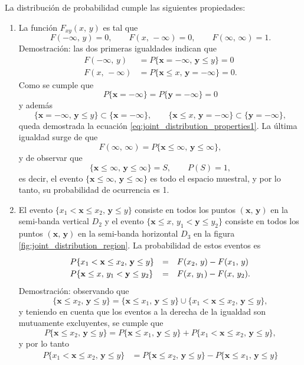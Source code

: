 \documentclass[a4paper]{report}
\newcommand{\x}{\mathbf{x}}
\newcommand{\y}{\mathbf{y}}
\begin{document}
La distribución de probabilidad cumple las siguientes propiedades:
\begin{enumerate}[1.]
 \item La función \(F_{xy}(x,\,y)\) es tal que
 \[
  F(-\infty,\,y)=0,\qquad F(x,\,-\infty)=0,\qquad F(\infty,\,\infty)=1.
 \]
 Demostración: las dos primeras igualdades indican que
 \begin{equation}\label{eq:joint_distribution_properties1}
 \begin{aligned}
    F(-\infty,\,y)&=P\{\x=-\infty,\,\y\leq y\}=0\\
    F(x,\,-\infty)&=P\{\x\leq x,\,\y=-\infty\}=0.
 \end{aligned}
 \end{equation}
 Como se cumple que
 \[
  P\{\x=-\infty\}=P\{\y=-\infty\}=0
 \]
 y además
 \[
  \{\x=-\infty,\,\y\leq y\}\subset \{\x=-\infty\},\qquad \{\x\leq x,\,\y=-\infty\}\subset \{\y=-\infty\},
 \]
 queda demostrada la ecuación \ref{eq:joint_distribution_properties1}. La última igualdad surge de que
 \[
  F(\infty,\,\infty)=P\{\x\leq\infty,\,\y\leq \infty\},
 \]
 y de observar que 
 \[
  \{\x\leq\infty,\,\y\leq \infty\}=S, \qquad P(S)=1,
 \]
 es decir, el evento \(\{\x\leq\infty,\,\y\leq \infty\}\) es todo el espacio muestral, y por lo tanto, su probabilidad de ocurrencia es 1.
 \item El evento \(\{x_1<\x\leq x_2,\,\y\leq y\}\) consiste en todos los puntos \((\x,\,\y)\) en la semi-banda vertical \(D_2\) y el evento \(\{\x\leq x,\,y_1<\y\leq y_2\}\) consiste en todos los puntos \((\x,\,\y)\) en la semi-banda horizontal \(D_3\) en la figura \ref{fig:joint_distribution_region}. La probabilidad de estos eventos es
 \begin{equation}\label{eq:joint_distribution_properties2}
 \def\arraystretch{1.2}
 \begin{array}{lll}
    P\{x_1<\x\leq x_2,\,\y\leq y\}&=&F(x_2,\,y)-F(x_1,\,y)\\
    P\{\x\leq x,\,y_1<\y\leq y_2\}&=&F(x,\,y_1)-F(x,\,y_2).
 \end{array}
 \end{equation} 
Demostración: observando que
\[
 \{\x\leq x_2,\,\y\leq y\}=\{\x\leq x_1,\,\y\leq y\}\cup\{x_1<\x\leq x_2,\,\y\leq y\},
\]
y teniendo en cuenta que los eventos a la derecha de la igualdad son mutuamente excluyentes, se cumple que
\[
 P\{\x\leq x_2,\,\y\leq y\}=P\{\x\leq x_1,\,\y\leq y\}+P\{x_1<\x\leq x_2,\,\y\leq y\},
\]
y por lo tanto
\begin{align*}
 P\{x_1<\x\leq x_2,\,\y\leq y\}&=P\{\x\leq x_2,\,\y\leq y\}-P\{\x\leq x_1,\,\y\leq y\}\\

\end{align*}
\end{enumerate}
\end{document}
